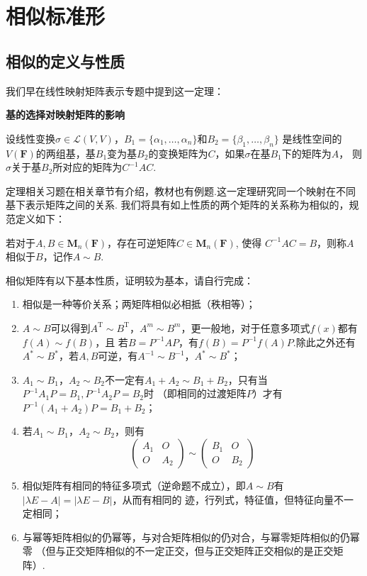 \chapter{相似标准形}

\section{相似的定义与性质}
我们早在线性映射矩阵表示专题中提到这一定理：
\begin{theorem}
    \textbf{\heiti 基的选择对映射矩阵的影响}

    设线性变换$\sigma \in \mathcal{L}(V,V)$，$B_1=\{\alpha_1,\ldots,\alpha_n\}$和$B_2=\{\beta_1,\ldots,\beta_n\}$
    是线性空间的$V(\mathbf{F})$的两组基，基$B_1$变为基$B_2$的变换矩阵为$C$，如果$\sigma$在基$B_1$下的矩阵为$A$，
    则$\sigma$关于基$B_2$所对应的矩阵为$C^{-1}AC$.
\end{theorem}
定理相关习题在相关章节有介绍，教材也有例题.这一定理研究同一个映射在不同基下表示矩阵之间的关系.
我们将具有如上性质的两个矩阵的关系称为相似的，规范定义如下：
\begin{definition}
    若对于$A,B\in \mathbf{M}_n(\mathbf{F})$，存在可逆矩阵$C\in \mathbf{M}_n(\mathbf{F})$, 使得
    $C^{-1}AC=B$，则称$A$相似于$B$，记作$A\sim B$.
\end{definition}
相似矩阵有以下基本性质，证明较为基本，请自行完成：
\begin{enumerate}
    \item 相似是一种等价关系；两矩阵相似必相抵（秩相等）；

    \item $A\sim B$可以得到$A^\mathrm{T}\sim B^\mathrm{T}$，$A^m\sim B^m$，更一般地，对于任意多项式$f(x)$都有$f(A)\sim f(B)$，且
    若$B=P^{-1}AP$，有$f(B)=P^{-1}f(A)P$.除此之外还有$A^*\sim B^*$，若$A,B$可逆，有$A^{-1}\sim B^{-1}$，$A^*\sim B^*$；

    \item $A_1\sim B_1$，$A_2\sim B_2$不一定有$A_1+A_2\sim B_1+B_2$，只有当$P^{-1}A_1P=B_1,P^{-1}A_2P=B_2$时
    （即相同的过渡矩阵$P$）才有$P^{-1}(A_1+A_2)P=B_1+B_2$；

    \item 若$A_1\sim B_1$，$A_2\sim B_2$，则有
    \[ \begin{pmatrix}
        A_1 & O \\ O & A_2
    \end{pmatrix}\sim\begin{pmatrix}
        B_1 & O \\ O & B_2
    \end{pmatrix}\]

    \item 相似矩阵有相同的特征多项式（逆命题不成立），即$A\sim B$有$|\lambda E-A|=|\lambda E-B|$，从而有相同的
    迹，行列式，特征值，但特征向量不一定相同；

    \item 与幂等矩阵相似的仍幂等，与对合矩阵相似的仍对合，与幂零矩阵相似的仍幂零
    （但与正交矩阵相似的不一定正交，但与正交矩阵正交相似的是正交矩阵）.
\end{enumerate}
